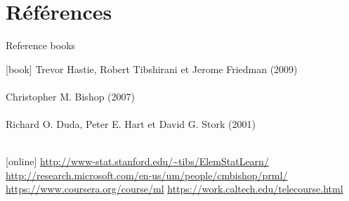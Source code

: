 \documentclass[compress, smaller, serif, 9pt]{beamer}
\begin{document}
\section{Références}

\begin{frame}
\begin{block}{Reference books}
\begin{thebibliography}{9}
[book]
 Trevor Hastie, Robert Tibshirani et Jerome Friedman (2009)\\
\\
\color{gray}{\it Springer Series in Statistics}
 Christopher M. Bishop (2007) \\
\\
\color{gray}{\it Springer}
Richard O. Duda, Peter E. Hart et David G. Stork (2001)\\
\\
\color{gray}{\it Wiley}
\end{thebibliography}
\end{block}

\begin{block}{}
\begin{thebibliography}{9}
[online]
 \url{http://www-stat.stanford.edu/~tibs/ElemStatLearn/}
 {\small \url{http://research.microsoft.com/en-us/um/people/cmbishop/prml/} }
 \url{https://www.coursera.org/course/ml} \color{gray}{\scriptsize \it very popular MOOC (Andrew Ng)}
 \url{https://work.caltech.edu/telecourse.html} \color{gray}{\scriptsize \it more involved MOOC (Y. Abu-Mostafa)}
\end{thebibliography}
\end{block}

\end{frame}
\end{document}
